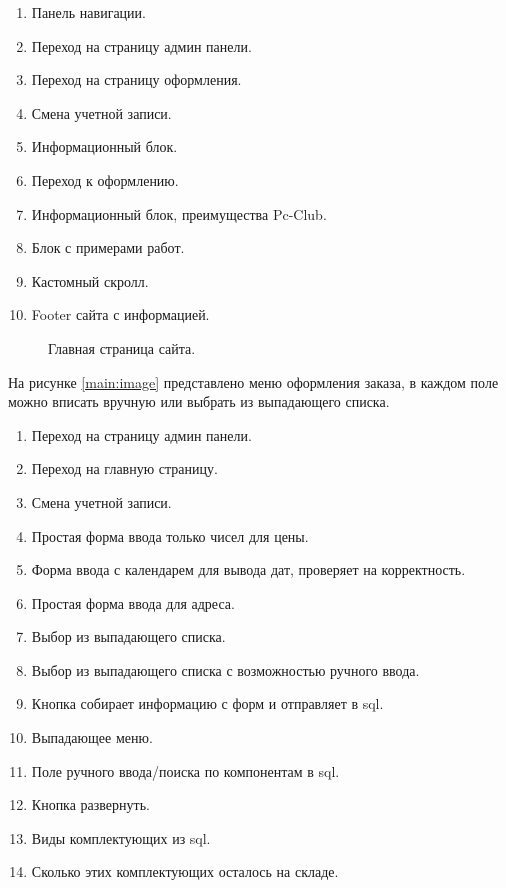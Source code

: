 \begin{enumerate}
	\item Панель навигации.
	\item Переход на страницу админ панели.
	\item Переход на страницу оформления.
	\item Смена учетной записи.
	\item Информационный блок.
	\item Переход к оформлению.
	\item Информационный блок, преимущества Pc-Club.
	\item Блок с примерами работ.
	\item Кастомный скролл.
	\item Footer сайта с информацией.
\end{enumerate}

\begin{figure}[ht]
\caption{Главная страница сайта.}
\label{index:image}
\end{figure}

\newpage 
На рисунке \ref{main:image} представлено меню оформления заказа,  в каждом поле можно вписать вручную или выбрать из выпадающего списка.
\begin{enumerate}
	\item Переход на страницу админ панели.
	\item Переход на главную страницу.
	\item Смена учетной записи.
	\item Простая форма ввода только чисел для цены.
	\item Форма ввода с календарем для вывода дат, проверяет на корректность.
	\item Простая форма ввода для адреса.
	\item Выбор из выпадающего списка.
	\item Выбор из выпадающего списка с возможностью ручного ввода.
	\item Кнопка собирает информацию с форм и отправляет в sql.
	\item Выпадающее меню.
	\item Поле ручного ввода/поиска по компонентам в sql.
	\item Кнопка развернуть.
	\item Виды комплектующих из sql.
	\item Сколько этих комплектующих осталось на складе.
\end{enumerate}

